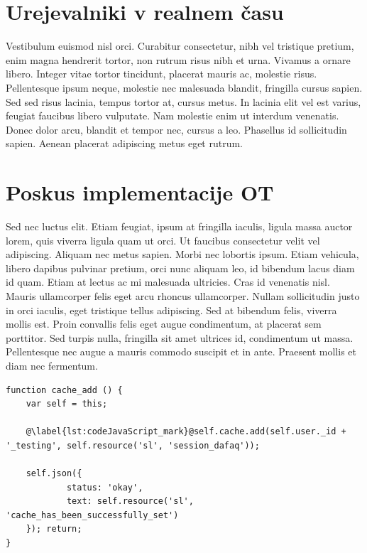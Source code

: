 \documentclass[a4paper, 12pt, twoside]{book}
\begin{document}
\chapter{Urejevalniki v realnem času}

Vestibulum euismod nisl orci. Curabitur consectetur, nibh vel tristique pretium, enim magna hendrerit tortor, non rutrum risus nibh et urna. Vivamus a ornare libero. Integer vitae tortor tincidunt, placerat mauris ac, molestie risus. Pellentesque ipsum neque, molestie nec malesuada blandit, fringilla cursus sapien. Sed sed risus lacinia, tempus tortor at, cursus metus. In lacinia elit vel est varius, feugiat faucibus libero vulputate. Nam molestie enim ut interdum venenatis. Donec dolor arcu, blandit et tempor nec, cursus a leo. Phasellus id sollicitudin sapien. Aenean placerat adipiscing metus eget rutrum.

\chapter{Poskus implementacije OT}

Sed nec luctus elit. Etiam feugiat, ipsum at fringilla iaculis, ligula massa auctor lorem, quis viverra ligula quam ut orci. Ut faucibus consectetur velit vel adipiscing. Aliquam nec metus sapien. Morbi nec lobortis ipsum. Etiam vehicula, libero dapibus pulvinar pretium, orci nunc aliquam leo, id bibendum lacus diam id quam. Etiam at lectus ac mi malesuada ultricies. Cras id venenatis nisl. Mauris ullamcorper felis eget arcu rhoncus ullamcorper. Nullam sollicitudin justo in orci iaculis, eget tristique tellus adipiscing. Sed at bibendum felis, viverra mollis est. Proin convallis felis eget augue condimentum, at placerat sem porttitor. Sed turpis nulla, fringilla sit amet ultrices id, condimentum ut massa. Pellentesque nec augue a mauris commodo suscipit et in ante. Praesent mollis et diam nec fermentum.

\begin{lstlisting}[caption={Interdum pretium}, label={lst:codeJavaScript}, title={Exampelus \ref{lst:codeJavaScript}: Interdum pretium}]
function cache_add () {
	var self = this;

	@\label{lst:codeJavaScript_mark}@self.cache.add(self.user._id + '_testing', self.resource('sl', 'session_dafaq'));

	self.json({
			status: 'okay',
			text: self.resource('sl', 'cache_has_been_successfully_set')
	}); return;
}
\end{lstlisting}
\end{document}
